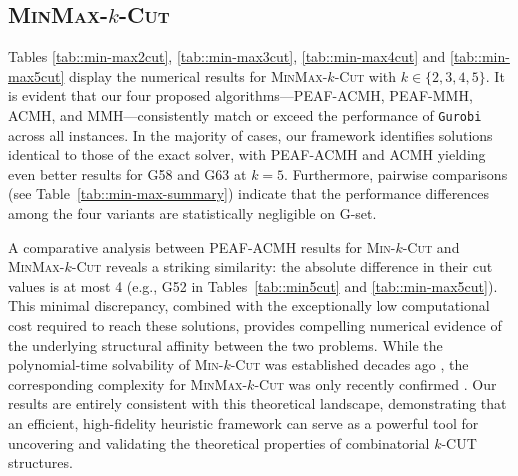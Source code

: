 \documentclass[12pt, a4paper]{article}%
\numberwithin{equation}{section}
\theoremstyle{plain}
\begin{document}
			
			\subsection{\textsc{MinMax}-$k$-\textsc{Cut}}
			\label{sec::min-max-k-cut}
			
				Tables \ref{tab::min-max2cut}, \ref{tab::min-max3cut}, \ref{tab::min-max4cut} and \ref{tab::min-max5cut} display the numerical results for \textsc{MinMax}-$k$-\textsc{Cut} with $k \in \{2, 3, 4, 5\}$. It is evident that our four proposed algorithms---PEAF-ACMH, PEAF-MMH, ACMH, and MMH---consistently match or exceed the performance of \texttt{Gurobi} across all instances. In the majority of cases, our framework identifies solutions identical to those of the exact solver, with PEAF-ACMH and ACMH yielding even better results for G58 and G63 at $k=5$. Furthermore, pairwise comparisons (see Table~\ref{tab::min-max-summary}) indicate that the performance differences among the four variants are statistically negligible on G-set.
			
			A comparative analysis between PEAF-ACMH results for \textsc{Min}-$k$-\textsc{Cut} and \textsc{MinMax}-$k$-\textsc{Cut} reveals a striking similarity: the absolute difference in their cut values is at most 4 (e.g., G52 in Tables~\ref{tab::min5cut} and \ref{tab::min-max5cut}). This minimal discrepancy, combined with the exceptionally low computational cost required to reach these solutions, provides compelling numerical evidence of the underlying structural affinity between the two problems. While the polynomial-time solvability of \textsc{Min}-$k$-\textsc{Cut} was established decades ago \cite{goldschmidt1994polynomial}, the corresponding complexity for \textsc{MinMax}-$k$-\textsc{Cut} was only recently confirmed \cite{chandrasekaran2023fixed}. Our results are entirely consistent with this theoretical landscape, demonstrating that an efficient, high-fidelity heuristic framework can serve as a powerful tool for uncovering and validating the theoretical properties of combinatorial $k$-CUT structures.
			

			
			
\end{document}
